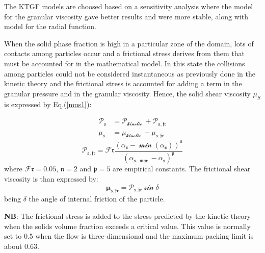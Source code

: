 \documentclass[review,3p,times,12pt]{elsarticle}
\begin{document}
The KTGF models are choosed based on a sensitivity analysis where the \citet{symlal1993} model for the granular viscosity gave better results and were more stable, along with \citet{sinclair-1989} model for the radial function.

When the solid phase fraction is high in a particular zone of the domain, lots of contacts among particles occur and a frictional stress derives from them that must be accounted for in the mathematical model. In this state the collisions among particles could not be considered instantaneous as previously done in the kinetic theory and the frictional stress is accounted for adding a term in the granular pressure and in the granular viscosity. Hence, the solid shear viscosity $\mu_S$ is expressed by Eq.(\ref{mus1}):

\begin{equation}
\begin{aligned}
\boldsymbol{\mathcal{P_\mathfrak{{s}}}} &=\mathcal{P_{\text {kinetic }}+P_\mathfrak{{s, fr}}} \\
\boldsymbol{\mathcal{\mu_\mathfrak{{s}}}} &=\mathcal{\mu_{\text {kinetic }}+\mu_\mathfrak{{s, fr}}}
\label{mus1}
\end{aligned}
\end{equation}
\begin{equation}
\boldsymbol{\mathcal{P_\mathfrak{{s, fr}}}}=\mathcal{F}\mathfrak{r} \frac{\left(\mathcal{\alpha}_\mathfrak{s}-\mathcal{\min \left(\alpha_\mathfrak{s}\right)}\right)^\mathfrak{n}}{\mathcal{\left(\alpha_\mathfrak{s, \max }-\alpha_\mathfrak{s}\right)^\mathfrak{p}}}
\end{equation}
where  $\boldsymbol{\mathcal{F}\mathfrak{r}}=0.05$, $\boldsymbol{\mathfrak{n}}=2$ and $\boldsymbol{\mathfrak{p}}=5$ are empirical constants. The frictional shear viscosity is than expressed by:
\begin{equation}
\mathcal{\boldsymbol{\mu_\mathfrak{{s, fr}}}=P_\mathfrak{{s, fr}} \sin \delta}
\end{equation}
being $\mathfrak{\delta}$ the angle of internal friction of the particle.

{\bf NB}: The frictional stress is added to the stress predicted by the kinetic theory when the solids volume fraction exceeds a critical value. This value is normally set to 0.5 when the flow is three-dimensional and the maximum packing limit is about 0.63.
\end{document}
